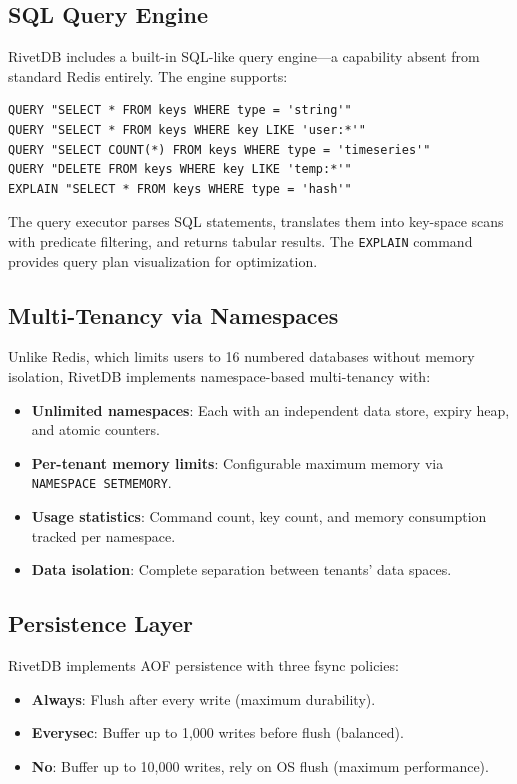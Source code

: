 \documentclass[conference,a4paper]{IEEEtran}
\begin{document}
\subsection{SQL Query Engine}

RivetDB includes a built-in SQL-like query engine---a capability absent from standard Redis entirely. The engine supports:

\begin{lstlisting}
QUERY "SELECT * FROM keys WHERE type = 'string'"
QUERY "SELECT * FROM keys WHERE key LIKE 'user:*'"
QUERY "SELECT COUNT(*) FROM keys WHERE type = 'timeseries'"
QUERY "DELETE FROM keys WHERE key LIKE 'temp:*'"
EXPLAIN "SELECT * FROM keys WHERE type = 'hash'"
\end{lstlisting}

The query executor parses SQL statements, translates them into key-space scans with predicate filtering, and returns tabular results. The \texttt{EXPLAIN} command provides query plan visualization for optimization.

\subsection{Multi-Tenancy via Namespaces}

Unlike Redis, which limits users to 16 numbered databases without memory isolation, RivetDB implements namespace-based multi-tenancy with:

\begin{itemize}
    \item \textbf{Unlimited namespaces}: Each with an independent data store, expiry heap, and atomic counters.
    \item \textbf{Per-tenant memory limits}: Configurable maximum memory via \texttt{NAMESPACE SETMEMORY}.
    \item \textbf{Usage statistics}: Command count, key count, and memory consumption tracked per namespace.
    \item \textbf{Data isolation}: Complete separation between tenants' data spaces.
\end{itemize}

\subsection{Persistence Layer}

RivetDB implements AOF persistence with three fsync policies:

\begin{itemize}
    \item \textbf{Always}: Flush after every write (maximum durability).
    \item \textbf{Everysec}: Buffer up to 1,000 writes before flush (balanced).
    \item \textbf{No}: Buffer up to 10,000 writes, rely on OS flush (maximum performance).
\end{itemize}
\end{document}
